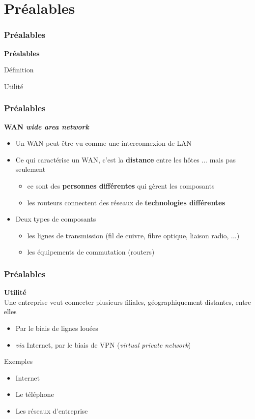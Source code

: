 \section{Préalables}

\begin{frame}[fragile]
  \frametitle{Préalables}
\begin{center}
	\Huge{\bf\color{blue}Préalables}
\end{center}
\begin{flushright}
  \item Définition
  \item Utilité
\end{flushright}
\end{frame}

\begin{frame}[fragile]
  \frametitle{Préalables}
\textbf{WAN \textit{wide area network}}
\begin{itemize}
	\item Un WAN peut être vu comme une interconnexion de LAN
	\item Ce qui caractérise un WAN, c'est la \textbf{distance} entre les hôtes
	... mais pas seulement
	\begin{itemize}
		\item ce sont des \textbf{personnes différentes} qui gèrent les composants
		\item les routeurs connectent des réseaux de \textbf{technologies différentes}
	\end{itemize}

	\item Deux types de composants
	\begin{itemize}
		\item les lignes de transmission (fil de cuivre, fibre optique, liaison radio, ...)
		\item les équipements de commutation (routers)
	\end{itemize}
\end{itemize}
\end{frame}

\begin{frame}[fragile]
  \frametitle{Préalables}
\textbf{Utilité} \\
Une entreprise veut connecter plusieurs filiales, géographiquement distantes, entre elles
\begin{itemize}
	\item Par le biais de lignes louées
	\item \textit{via} Internet, par le biais de VPN (\textit{virtual private network})
\end{itemize}

Exemples
\begin{itemize}
	\item Internet
	\item Le téléphone
	\item Les réseaux d'entreprise
\end{itemize}
\end{frame}
